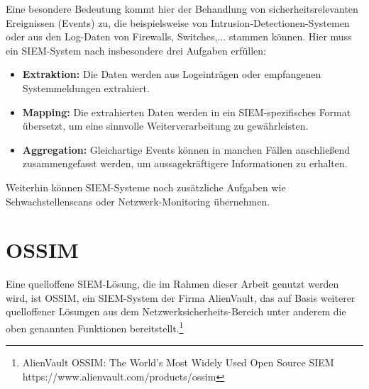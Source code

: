 Eine besondere Bedeutung kommt hier der Behandlung von sicherheitsrelevanten Ereignissen (Events) zu, die beispielsweise von Intrusion-Detectionen-Systemen oder aus den Log-Daten von Firewalls, Switches,... stammen können. Hier muss ein SIEM-System nach \cite{detken2014} insbesondere drei Aufgaben erfüllen:
\begin{itemize}
	\item \textbf{Extraktion:} Die Daten werden aus Logeinträgen oder empfangenen Systemmeldungen extrahiert. 
	\item \textbf{Mapping:} Die extrahierten Daten werden in ein SIEM-spezifisches Format übersetzt, um eine sinnvolle Weiterverarbeitung zu gewährleisten.
	\item \textbf{Aggregation:} Gleichartige Events können in manchen Fällen anschließend zusammengefasst werden, um aussagekräftigere Informationen zu erhalten.
\end{itemize}

Weiterhin können SIEM-Systeme noch zusätzliche Aufgaben wie Schwachstellenscans oder Netzwerk-Monitoring übernehmen.

\section{OSSIM}

Eine quelloffene SIEM-Lösung, die im Rahmen dieser Arbeit genutzt werden wird, ist OSSIM, ein SIEM-System der Firma AlienVault, das auf Basis weiterer quelloffener Lösungen aus dem Netzwerksicherheits-Bereich unter anderem die oben genannten Funktionen bereitstellt.\footnote{
	AlienVault OSSIM: The World’s Most Widely Used Open Source SIEM\\https://www.alienvault.com/products/ossim
}